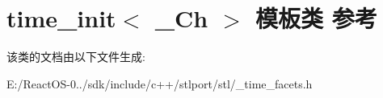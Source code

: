 \hypertarget{classtime__init}{}\section{time\+\_\+init$<$ \+\_\+\+Ch $>$ 模板类 参考}
\label{classtime__init}


该类的文档由以下文件生成\+:\begin{DoxyCompactItemize}
\item 
E\+:/\+React\+O\+S-\/0../sdk/include/c++/stlport/stl/\+\_\+time\+\_\+facets.\+h\end{DoxyCompactItemize}
